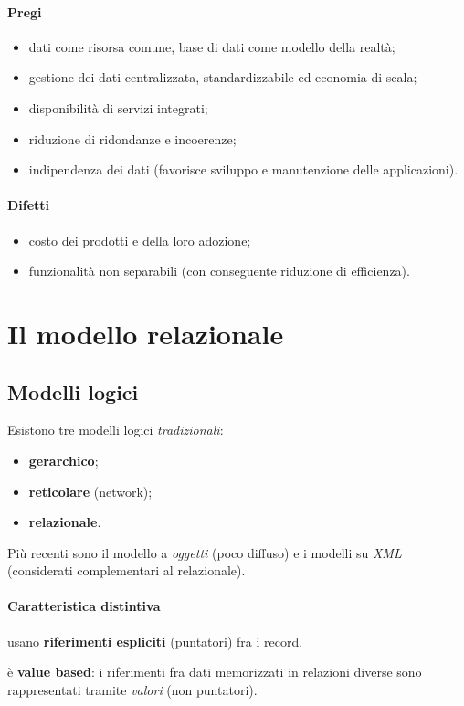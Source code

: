 \documentclass[a4paper,12pt]{article}
\begin{document}
\paragraph{Pregi}
\begin{itemize}
  \item dati come risorsa comune, base di dati come modello della realtà;
  \item gestione dei dati centralizzata, standardizzabile ed economia di scala;
  \item disponibilità di servizi integrati;
  \item riduzione di ridondanze e incoerenze;
  \item indipendenza dei dati (favorisce sviluppo e manutenzione delle
    applicazioni).
\end{itemize}

\paragraph{Difetti}
\begin{itemize}
  \item costo dei prodotti e della loro adozione;
  \item funzionalità non separabili (con conseguente riduzione di efficienza).
\end{itemize}

\section{Il modello relazionale}

\subsection{Modelli logici}

Esistono tre modelli logici \emph{tradizionali}:
\begin{itemize}
  \item \textbf{gerarchico};
  \item \textbf{reticolare} (network);
  \item \textbf{relazionale}.
\end{itemize}
Più recenti sono il modello a \emph{oggetti} (poco diffuso) e i modelli su
\emph{XML} (considerati complementari al relazionale).

\paragraph{Caratteristica distintiva}
\begin{description}[style=nextline]
  \item[Gerarchico e reticolare] usano \textbf{riferimenti espliciti}
    (puntatori) fra i record.
  \item[Relazionale] è \textbf{value based}: i riferimenti fra dati memorizzati
    in relazioni diverse sono rappresentati tramite \emph{valori} (non
    puntatori).
\end{description}
\end{document}
